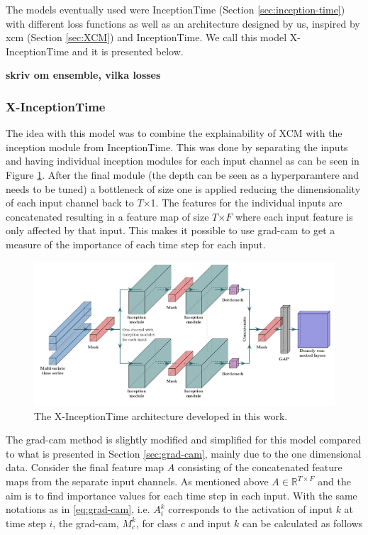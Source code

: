 The models eventually used were InceptionTime (Section \ref{sec:inception-time}) with different loss functions as well as an architecture designed by us, inspired by
\gls{xcm} (Section \ref{sec:XCM}) and InceptionTime. We call this model X-InceptionTime and it is presented below.

\textbf{skriv om ensemble, vilka losses}

\subsubsection{X-InceptionTime}
The idea with this model was to combine the explainability of XCM with the inception module from InceptionTime. This was done by separating the inputs and having individual inception modules for each input channel as can be seen in Figure \ref{fig:x-inception}. After the final module (the depth can be seen as a hyperparamtere and needs to be tuned) a bottleneck of size one is applied reducing the dimensionality of each input channel back to $T$$\times$1. The features for the individual inputs are concatenated resulting in a feature map of size $T$$\times$$F$ where each input feature is only affected by that input. This makes it possible to use \gls{grad-cam} to get a measure of the importance of each time step for each input.

\begin{figure}
  \centering
  \includegraphics[width=\textwidth]{files/figs/met/x-inception-w-masks.pdf}
  \caption{The X-InceptionTime architecture developed in this work.}
  \label{fig:x-inception}
\end{figure}

The \gls{grad-cam} method is slightly modified and simplified for this model compared to what is presented in Section \ref{sec:grad-cam}, mainly due to the one dimensional data. Consider the final feature map $A$ consisting of the concatenated feature maps from the separate input channels. As mentioned above $A \in \mathbb{R}^{T \times F}$ and the aim is to find importance values for each time step in each input. With the same notations as in \eqref{eq:grad-cam}, i.e. $A_i^k$ corresponds to the activation of input $k$ at time step $i$, the \gls{grad-cam}, $M_c^k$, for class $c$ and input $k$ can be calculated as follows

